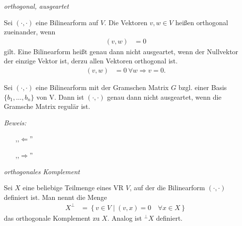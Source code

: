 \begin{mydef} \label{orthogonal,ausgeartet} \textit{orthogonal, ausgeartet}

    Sei $(\cdot , \cdot )$ eine Bilinearform auf $V$.
    Die Vektoren $v,w\in V$ heißen orthogonal zueinander, wenn 
    \begin{align*}
        (v,w) & = 0
    \end{align*}
    gilt.
    Eine Bilinearform heißt genau dann nicht ausgeartet, wenn der Nullvektor der einzige Vektor ist, derzu allen Vektoren orthogonal ist.
    \begin{align*}
        (v,w) & = 0 \ \forall w \Rightarrow v = 0.
    \end{align*}
\end{mydef}


\begin{mylemma}

    Sei $(\cdot , \cdot )$ eine Bilinearform mit der Gramschen Matrix $G$ bzgl. einer Basis $\{ b_1, \ldots, b_n \}$ von V.
    Dann ist $(\cdot , \cdot)$ genau dann nicht ausgeartet, wenn die Gramsche Matrix regulär ist.\par\medskip

    \textit{Beweis:}
    \begin{itemize}
        \item[,,$\Leftarrow$'']
        \item[,,$\Rightarrow$'']
    \end{itemize}
\end{mylemma}


\begin{mydef} \label{orthogonalesKomplemen} \textit{orthogonales Komplement}

    Sei $X$ eine beliebige Teilmenge eines VR $V$, auf der die Bilinearform $(\cdot , \cdot)$ definiert ist.
    Man nennt die Menge
    \begin{align*}
        X^{\perp} & = \left\{ v \in V \mid (v,x) = 0 \quad \forall x \in X \right\}
    \end{align*}
    das orthogonale Komplement zu $X$. 
    Analog ist $^{\perp}X$ definiert.
\end{mydef}

